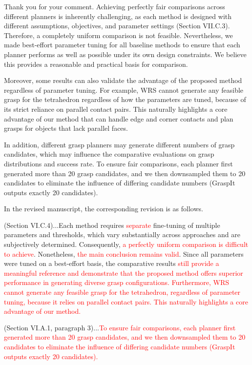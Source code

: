 \documentclass[journal]{IEEEtran}
\newcommand{\rev}[1]{\textcolor{red}{#1}}
\begin{document}
Thank you for your comment. Achieving perfectly fair comparisons across different planners is inherently challenging, as each method is designed with different assumptions, objectives, and parameter settings (Section VII.C.3). Therefore, a completely uniform comparison is not feasible.
Nevertheless, we made best-effort parameter tuning for all baseline methods to ensure that each planner performs as well as possible under its own design constraints. We believe this provides a reasonable and practical basis for comparison.

Moreover, some results can also validate the advantage of the proposed method regardless of parameter tuning.  For example, WRS cannot generate any feasible grasp for the tetrahedron regardless of how the parameters are tuned, because of its strict reliance on parallel contact pairs. This naturally highlights a core advantage of our method that can handle edge and corner contacts and plan grasps for objects that lack parallel faces.

In addition, different grasp planners may generate different numbers of grasp candidates, which may influence the comparative evaluations on grasp distributions and success rate. To ensure fair comparisons, each planner first generated more
than 20 grasp candidates, and we then downsampled them to 20 candidates to eliminate the influence of differing candidate numbers (GraspIt outputs exactly 20 candidates).

In the revised manuscript, the corresponding revision is as follows.

(Section VI.C.4)...Each method requires \rev{separate} fine-tuning of multiple parameters and thresholds, which vary substantially across approaches and are subjectively determined. Consequently, \rev{a perfectly uniform comparison is difficult to achieve}. Nonetheless, \rev{the main conclusion remains valid}. Since all parameters were tuned on a best-effort basis, the comparative results \rev{still provide a meaningful reference and demonstrate that the proposed method offers superior performance in generating diverse grasp configurations. Furthermore, WRS cannot generate any feasible grasp for the tetrahedron, regardless of parameter tuning, because it relies on parallel contact pairs. This naturally highlights a core advantage of our method.}

(Section VI.A.1, paragraph 3)...\rev{To ensure fair comparisons, each planner first generated more
than 20 grasp candidates, and we then downsampled them to 20 candidates to eliminate the influence of differing candidate numbers (GraspIt outputs exactly 20 candidates).}
\end{document}
